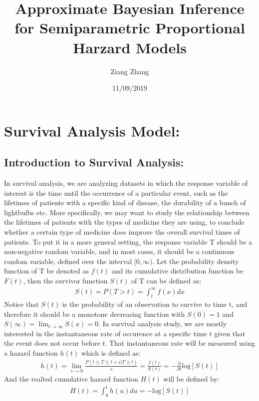\documentclass[]{article}
\title{Approximate Bayesian Inference for Semiparametric Proportional Harzard
Models}
\author{Ziang Zhang}
\date{11/09/2019}
\begin{document}
\maketitle

\hypertarget{survival-analysis-model}{%
\section{Survival Analysis Model:}\label{survival-analysis-model}}

\hypertarget{introduction-to-survival-analysis}{%
\subsection{Introduction to Survival
Analysis:}\label{introduction-to-survival-analysis}}

In survival analysis, we are analyzing datasets in which the response
variable of interest is the time until the occurrence of a particular
event, such as the lifetimes of patients with a specific kind of
disease, the durability of a bunch of lightbulbs etc. More specifically,
we may want to study the relationship between the lifetimes of patients
with the types of medicine they are using, to conclude whether a certain
type of medicine does improve the overall survival times of patients. To
put it in a more general setting, the response variable T should be a
non-negative random variable, and in most cases, it should be a
continuous random variable, defined over the interval \([0,\infty)\).
Let the probability density function of T be denoted as \(f(t)\) and its
cumulative distribution function be \(F(t)\), then the survivor function
\(S(t)\) of T can be defined as:
\begin{equation}\begin{aligned}\label{eqn:survivor}
S(t) = P(T > t) = \int_{t}^{\infty} f(x) dx
\end{aligned}\end{equation} Notice that \(S(t)\) is the probability of
an observation to survive to time t, and therefore it should be a
monotone decreasing function with \(S(0) = 1\) and
\(S(\infty) = \lim_{t\to\infty} S(x) = 0\). In survival analysis study,
we are mostly interested in the instantaneous rate of occurence at a
specific time \(t\) given that the event does not occur before \(t\).
That instantaneous rate will be measured using a hazard function
\(h(t)\) which is defined as:
\begin{equation}\begin{aligned}\label{eqn:hazard}
h(t) = \lim_{s\to 0} \frac{P(t\le T \le t+s |T\ge t)}{s} = \frac{f(t)}{S(t)} = -\frac{\partial}{\partial t}\text{log}[S(t)]
\end{aligned}\end{equation} And the realted cumulative hazard function
\(H(t)\) will be defined by:
\begin{equation}\begin{aligned}\label{eqn:chazard}
H(t) = \int_{0}^{t} h(u) du = -\text{log}[S(t)]
\end{aligned}\end{equation}
\end{document}
